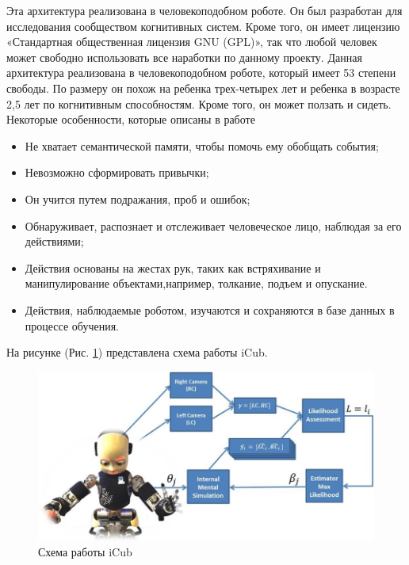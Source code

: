 Эта архитектура реализована в человекоподобном роботе. Он был разработан для исследования сообществом когнитивных систем. 
Кроме того, он имеет лицензию «Стандартная общественная лицензия GNU (GPL)», так что любой человек может свободно использовать 
все наработки по данному проекту. Данная архитектура реализована в человекоподобном роботе, который имеет 53 степени свободы. 
По размеру он похож на ребенка трех-четырех лет и ребенка в возрасте 2,5 лет по когнитивным способностям. Кроме того, он может 
ползать и сидеть. Некоторые особенности, которые описаны в работе \cite{Samsonovich02}

\begin{itemize}
	\item	Не хватает семантической памяти, чтобы помочь ему обобщать события;
	\item Невозможно сформировать привычки;
	\item Он учится путем подражания, проб и ошибок;
	\item Обнаруживает, распознает и отслеживает человеческое лицо, наблюдая за его действиями; 
	\item Действия основаны на жестах рук, таких как встряхивание и манипулирование объектами,например, толкание, подъем и опускание. 
	\item Действия, наблюдаемые роботом, изучаются и сохраняются в базе данных в процессе обучения.
\end{itemize}

На рисунке (Рис. \ref{pic:ris4}) представлена схема работы iCub.
\begin{figure}[h]
\includegraphics[width=0.75\columnwidth]{./img/ris4.png}
\centering
\caption{Схема работы iCub}
\label{pic:ris4}
\end{figure}

